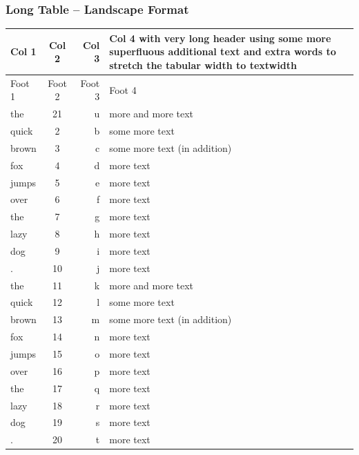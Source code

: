 \documentclass{pharmrep}
\begin{document}
\subsubsection{Long Table -- Landscape Format}
\label{tab:longtableLandscape}
\begin{tabularx}{\textwidth}{lcrX}
   \toprule
   \textbf{Col 1} &  \textbf{Col 2} &  \textbf{Col 3} & \textbf{Col 4 with very long header using some more
      superfluous additional text and extra words to stretch the tabular width to textwidth} \\
   \midrule\endhead
   \midrule
   Foot 1 & Foot 2 & Foot 3 & Foot 4 \\\bottomrule\endfoot
   the   & 21    & u     & more and more text \\ \midrule
   quick & 2     & b     & some more text \\ \midrule
   brown & 3     & c     & some more text (in addition) \\ \midrule
   fox   & 4     & d     & more text \\ \midrule
   jumps & 5     & e     & more text \\ \midrule
   over  & 6     & f     & more text \\ \midrule
   the   & 7     & g     & more text \\ \midrule
   lazy  & 8     & h     & more text \\ \midrule
   dog   & 9     & i     & more text \\ \midrule
   .     & 10    & j     & more text \\ \midrule
   the   & 11    & k     & more and more text \\ \midrule
   quick & 12    & l     & some more text \\ \midrule
   brown & 13    & m     & some more text (in addition) \\ \midrule
   fox   & 14    & n     & more text \\ \midrule
   jumps & 15    & o     & more text \\ \midrule
   over  & 16    & p     & more text \\ \midrule
   the   & 17    & q     & more text \\ \midrule
   lazy  & 18    & r     & more text \\ \midrule
   dog   & 19    & s     & more text \\ \midrule
   .     & 20    & t     & more text \\ \midrule

\end{tabularx}
\end{document}
